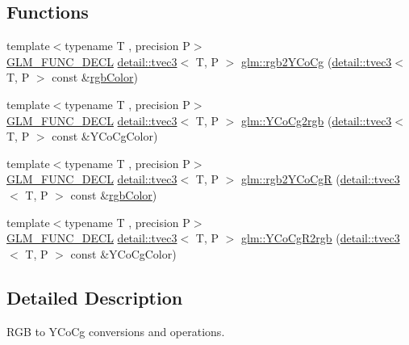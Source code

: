 \subsection*{Functions}
\begin{DoxyCompactItemize}
\item 
{\footnotesize template$<$typename T , precision P$>$ }\\\hyperlink{setup_8hpp_ab2d052de21a70539923e9bcbf6e83a51}{G\+L\+M\+\_\+\+F\+U\+N\+C\+\_\+\+D\+E\+CL} \hyperlink{structglm_1_1detail_1_1tvec3}{detail\+::tvec3}$<$ T, P $>$ \hyperlink{group__gtx__color__space___y_co_cg_ga2a235b86e67866fd9fef640bcc47c93d}{glm\+::rgb2\+Y\+Co\+Cg} (\hyperlink{structglm_1_1detail_1_1tvec3}{detail\+::tvec3}$<$ T, P $>$ const \&\hyperlink{group__gtx__color__space_gafe29cc37c2675aee66c9f9ae3e5e7294}{rgb\+Color})
\item 
{\footnotesize template$<$typename T , precision P$>$ }\\\hyperlink{setup_8hpp_ab2d052de21a70539923e9bcbf6e83a51}{G\+L\+M\+\_\+\+F\+U\+N\+C\+\_\+\+D\+E\+CL} \hyperlink{structglm_1_1detail_1_1tvec3}{detail\+::tvec3}$<$ T, P $>$ \hyperlink{group__gtx__color__space___y_co_cg_gab40e31e352d2d318d3f062df2882c500}{glm\+::\+Y\+Co\+Cg2rgb} (\hyperlink{structglm_1_1detail_1_1tvec3}{detail\+::tvec3}$<$ T, P $>$ const \&Y\+Co\+Cg\+Color)
\item 
{\footnotesize template$<$typename T , precision P$>$ }\\\hyperlink{setup_8hpp_ab2d052de21a70539923e9bcbf6e83a51}{G\+L\+M\+\_\+\+F\+U\+N\+C\+\_\+\+D\+E\+CL} \hyperlink{structglm_1_1detail_1_1tvec3}{detail\+::tvec3}$<$ T, P $>$ \hyperlink{group__gtx__color__space___y_co_cg_gaeee43c2a06fe63d46a96cee4d1c63ce6}{glm\+::rgb2\+Y\+Co\+CgR} (\hyperlink{structglm_1_1detail_1_1tvec3}{detail\+::tvec3}$<$ T, P $>$ const \&\hyperlink{group__gtx__color__space_gafe29cc37c2675aee66c9f9ae3e5e7294}{rgb\+Color})
\item 
{\footnotesize template$<$typename T , precision P$>$ }\\\hyperlink{setup_8hpp_ab2d052de21a70539923e9bcbf6e83a51}{G\+L\+M\+\_\+\+F\+U\+N\+C\+\_\+\+D\+E\+CL} \hyperlink{structglm_1_1detail_1_1tvec3}{detail\+::tvec3}$<$ T, P $>$ \hyperlink{group__gtx__color__space___y_co_cg_ga7b90b9b5758dbe96a82a2ef8237a17e9}{glm\+::\+Y\+Co\+Cg\+R2rgb} (\hyperlink{structglm_1_1detail_1_1tvec3}{detail\+::tvec3}$<$ T, P $>$ const \&Y\+Co\+Cg\+Color)
\end{DoxyCompactItemize}


\subsection{Detailed Description}
R\+GB to Y\+Co\+Cg conversions and operations. 

